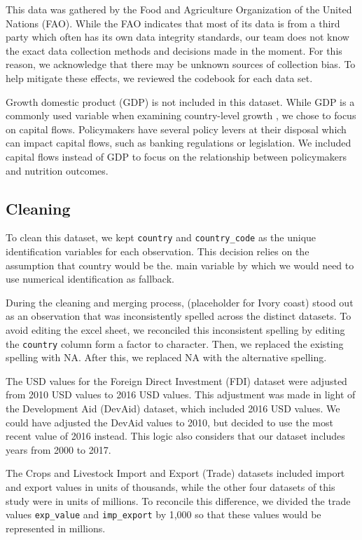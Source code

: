 \documentclass[
]{article}
\begin{document}
This data was gathered by the Food and Agriculture Organization of the
United Nations (FAO). While the FAO indicates that most of its data is
from a third party which often has its own data integrity standards, our
team does not know the exact data collection methods and decisions made
in the moment. For this reason, we acknowledge that there may be unknown
sources of collection bias. To help mitigate these effects, we reviewed
the codebook for each data set.

Growth domestic product (GDP) is not included in this dataset. While GDP
is a commonly used variable when examining country-level growth , we
chose to focus on capital flows. Policymakers have several policy levers
at their disposal which can impact capital flows, such as banking
regulations or legislation. We included capital flows instead of GDP to
focus on the relationship between policymakers and nutrition outcomes.

\hypertarget{cleaning}{%
\subsection{Cleaning}\label{cleaning}}

To clean this dataset, we kept \texttt{country} and
\texttt{country\_code} as the unique identification variables for each
observation. This decision relies on the assumption that country would
be the. main variable by which we would need to use numerical
identification as fallback.

During the cleaning and merging process, (placeholder for Ivory coast)
stood out as an observation that was inconsistently spelled across the
distinct datasets. To avoid editing the excel sheet, we reconciled this
inconsistent spelling by editing the \texttt{country} column form a
factor to character. Then, we replaced the existing spelling with NA.
After this, we replaced NA with the alternative spelling.

The USD values for the Foreign Direct Investment (FDI) dataset were
adjusted from 2010 USD values to 2016 USD values. This adjustment was
made in light of the Development Aid (DevAid) dataset, which included
2016 USD values. We could have adjusted the DevAid values to 2010, but
decided to use the most recent value of 2016 instead. This logic also
considers that our dataset includes years from 2000 to 2017.

The Crops and Livestock Import and Export (Trade) datasets included
import and export values in units of thousands, while the other four
datasets of this study were in units of millions. To reconcile this
difference, we divided the trade values \texttt{exp\_value} and
\texttt{imp\_export} by 1,000 so that these values would be represented
in millions.
\end{document}
